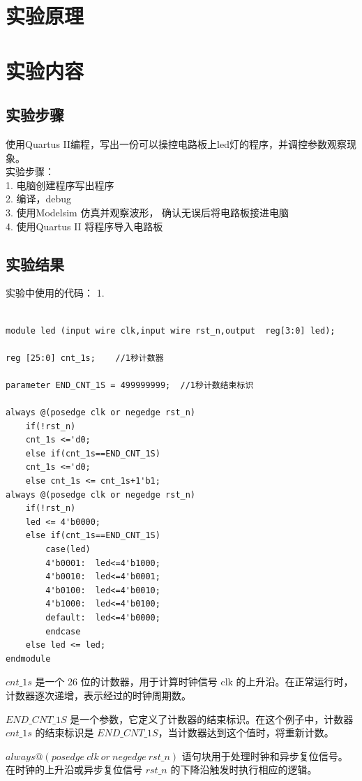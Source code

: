 \documentclass[12pt]{article}
\begin{document}
\pagestyle{headings}


\section{实验原理}
\section{实验内容}
\subsection{实验步骤}
使用Quartus II编程，写出一份可以操控电路板上led灯的程序，并调控参数观察现象。\\
实验步骤：\\
1.	电脑创建程序写出程序\\
2.	编译，debug\\
3.	使用Modelsim 仿真并观察波形， 确认无误后将电路板接进电脑\\
4.	使用Quartus II 将程序导入电路板\\

\subsection{实验结果}
实验中使用的代码：
1.
\begin{lstlisting}

module led (input wire clk,input wire rst_n,output  reg[3:0] led);

reg [25:0] cnt_1s;    //1秒计数器

parameter END_CNT_1S = 499999999;  //1秒计数结束标识

always @(posedge clk or negedge rst_n)
	if(!rst_n)
	cnt_1s <='d0;
	else if(cnt_1s==END_CNT_1S)
	cnt_1s <='d0;
	else cnt_1s <= cnt_1s+1'b1;
always @(posedge clk or negedge rst_n)
	if(!rst_n)
	led <= 4'b0000;
	else if(cnt_1s==END_CNT_1S)
		case(led)
		4'b0001:  led<=4'b1000;
		4'b0010:  led<=4'b0001;
		4'b0100:  led<=4'b0010;
		4'b1000:  led<=4'b0100;
		default:  led<=4'b0000;
		endcase
	else led <= led;
endmodule
\end{lstlisting}
$cnt\_1s$ 是一个 26 位的计数器，用于计算时钟信号 clk 的上升沿。在正常运行时，计数器逐次递增，表示经过的时钟周期数。

$END\_CNT\_1S$ 是一个参数，它定义了计数器的结束标识。在这个例子中，计数器 $cnt\_1s$ 的结束标识是 $END\_CNT\_1S$，当计数器达到这个值时，将重新计数。

$always @(posedge\ clk\ or\ negedge\ rst\_n)$ 语句块用于处理时钟和异步复位信号。在时钟的上升沿或异步复位信号 $rst\_n$ 的下降沿触发时执行相应的逻辑。
\end{document}

